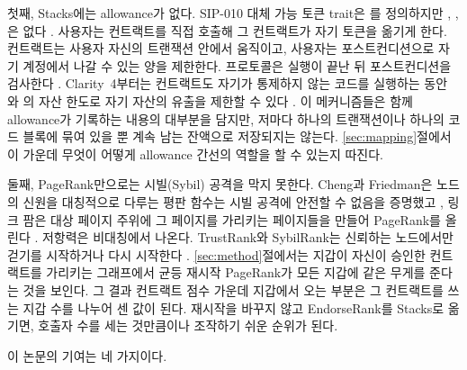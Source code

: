첫째, Stacks에는 allowance가 없다. SIP-010 대체 가능 토큰 trait은 를 정의하지만 , , 은 없다 \cite{sip010}. 사용자는 컨트랙트를 직접 호출해 그 컨트랙트가 자기 토큰을 옮기게 한다. 컨트랙트는 사용자 자신의 트랜잭션 안에서 움직이고, 사용자는 포스트컨디션으로 자기 계정에서 나갈 수 있는 양을 제한한다. 프로토콜은 실행이 끝난 뒤 포스트컨디션을 검사한다 \cite{sip005}. Clarity~4부터는 컨트랙트도 자기가 통제하지 않는 코드를 실행하는 동안 와 의 자산 한도로 자기 자산의 유출을 제한할 수 있다 \cite{sip033}. 이 메커니즘들은 함께 allowance가 기록하는 내용의 대부분을 담지만, 저마다 하나의 트랜잭션이나 하나의 코드 블록에 묶여 있을 뿐 계속 남는 잔액으로 저장되지는 않는다. \ref{sec:mapping}절에서 이 가운데 무엇이 어떻게 allowance 간선의 역할을 할 수 있는지 따진다.

둘째, PageRank만으로는 시빌(Sybil) 공격을 막지 못한다. Cheng과 Friedman은 노드의 신원을 대칭적으로 다루는 평판 함수는 시빌 공격에 안전할 수 없음을 증명했고 \cite{cheng2005sybilproof}, 링크 팜은 대상 페이지 주위에 그 페이지를 가리키는 페이지들을 만들어 PageRank를 올린다 \cite{gyongyi2005alliances}. 저항력은 비대칭에서 나온다. TrustRank와 SybilRank는 신뢰하는 노드에서만 걷기를 시작하거나 다시 시작한다 \cite{gyongyi2004trustrank,cao2012sybilrank}. \ref{sec:method}절에서는 지갑이 자신이 승인한 컨트랙트를 가리키는 그래프에서 균등 재시작 PageRank가 모든 지갑에 같은 무게를 준다는 것을 보인다. 그 결과 컨트랙트 점수 가운데 지갑에서 오는 부분은 그 컨트랙트를 쓰는 지갑 수를 나누어 센 값이 된다. 재시작을 바꾸지 않고 EndorseRank를 Stacks로 옮기면, 호출자 수를 세는 것만큼이나 조작하기 쉬운 순위가 된다.

이 논문의 기여는 네 가지이다.

